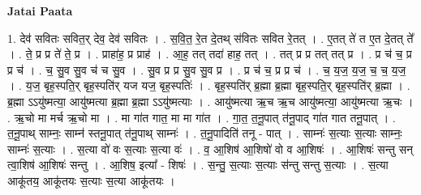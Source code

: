 \documentclass[17pt]{extarticle}
\begin{document}
\textbf{Jatai Paata} \newline

1. देव॑ सवितः सवित॒र् देव॒ देव॑ सवितः । . स॒वि॒त॒ रे॒त दे॒तथ् स॑वितः सवित रे॒तत् । . ए॒तत् ते॑ त ए॒त दे॒तत् ते᳚ । . ते॒ प्र प्र ते॑ ते॒ प्र । . प्राहा॑ह॒ प्र प्राह॑ । . आ॒ह॒ तत् तदा॑ हाह॒ तत् । . तत् प्र प्र तत् तत् प्र । . प्र च॑ च॒ प्र प्र च॑ । . च॒ सु॒व सु॒व च॑ च सु॒व । . सु॒व प्र प्र सु॒व सु॒व प्र । . प्र च॑ च॒ प्र प्र च॑ । . च॒ य॒ज॒ य॒ज॒ च॒ च॒ य॒ज॒ । . य॒ज॒ बृह॒स्पति॒र् बृह॒स्पति॑र् यज यज॒ बृह॒स्पतिः॑ । . बृह॒स्पति॑र् ब्र॒ह्मा ब्र॒ह्मा बृह॒स्पति॒र् बृह॒स्पति॑र् ब्र॒ह्मा । . ब्र॒ह्मा ऽऽयु॑ष्मत्या॒ आयु॑ष्मत्या ब्र॒ह्मा ब्र॒ह्मा ऽऽयु॑ष्मत्याः । . आयु॑ष्मत्या ऋ॒च ऋ॒च आयु॑ष्मत्या॒ आयु॑ष्मत्या ऋ॒चः । . ऋ॒चो मा मर्च ऋ॒चो मा । . मा गा॑त गात॒ मा मा गा॑त । . गा॒त॒ त॒नू॒पात् त॑नू॒पाद् गा॑त गात तनू॒पात् । . त॒नू॒पाथ् साम्नः॒ साम्न॑ स्तनू॒पात् त॑नू॒पाथ् साम्नः॑ । . त॒नू॒पादिति॑ तनू - पात् । . साम्नः॑ स॒त्याः स॒त्याः साम्नः॒ साम्नः॑ स॒त्याः । . स॒त्या वो॑ वः स॒त्याः स॒त्या वः॑ । . व॒ आ॒शिष॑ आ॒शिषो॑ वो व आ॒शिषः॑ । . आ॒शिषः॑ सन्तु सन् त्वा॒शिष॑ आ॒शिषः॑ सन्तु । . आ॒शिष॒ इत्या᳚ - शिषः॑ । . स॒न्तु॒ स॒त्याः स॒त्याः स॑न्तु सन्तु स॒त्याः । . स॒त्या आकू॑तय॒ आकू॑तयः स॒त्याः स॒त्या आकू॑तयः । \newline
\end{document}
